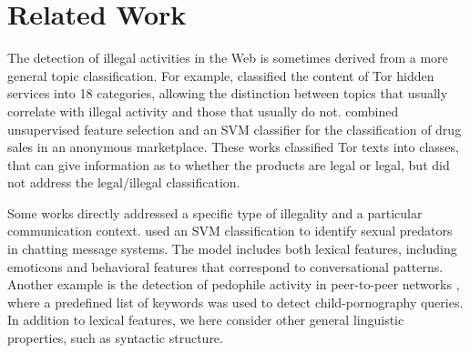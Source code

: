 \documentclass[11pt,a4paper,table]{article}
\newcommand{\oa}[1]{\footnote{\color{red}OA: #1}}
\newcommand{\es}[1]{\footnote{\color{purple}ES: #1}}
\begin{document}
\section{Related Work}

The detection of illegal activities in the Web is sometimes derived from a more general topic classification. For example, \citet{Biryukov14}
classified the content of Tor hidden services into 18 categories, allowing the distinction between topics that usually correlate with illegal activity and those that usually do not. \citet{GraczykKinningham15} combined unsupervised feature selection and an SVM classifier for the classification of drug sales in an anonymous marketplace.
These works classified Tor texts into classes, that can give information as to whether the products are legal or legal, but did not address the legal/illegal classification.


Some works directly addressed a specific type of illegality and a particular communication context. \citet{MorrisHirst12} used an SVM classification to identify sexual predators in chatting message systems. The model includes both lexical features, including emoticons and behavioral features that correspond to conversational patterns. Another example is the detection of pedophile activity in peer-to-peer networks \citep{Latapy13}, where a predefined list of keywords was used to detect child-pornography queries. In addition to lexical features, we here consider other general linguistic properties, such as syntactic structure.%
\end{document}
